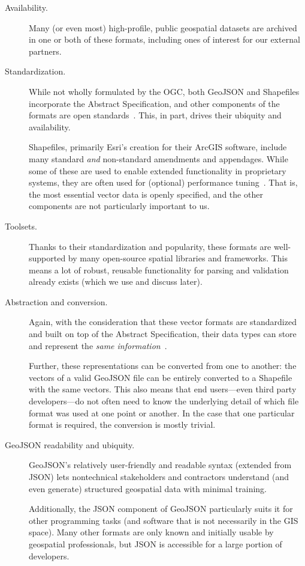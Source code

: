 \begin{description}
  \item[Availability.] Many (or even most) high-profile, public geospatial datasets are archived in one or both of these formats, including ones of interest for our external partners.
  \item[Standardization.] While not wholly formulated by the OGC, both GeoJSON and Shapefiles incorporate the Abstract Specification, and other components of the formats are open standards~\cite{Environ1998,GeoJSON}. This, in part, drives their ubiquity and availability.
  
Shapefiles, primarily Esri's creation for their ArcGIS software, include many standard \textit{and} non-standard amendments and appendages. While some of these are used to enable extended functionality in proprietary systems, they are often used for (optional) performance tuning~\cite{Environ1998}. That is, the most essential vector data is openly specified, and the other components are not particularly important to us.

\item[Toolsets.] Thanks to their standardization and popularity, these formats  are well-supported by many open-source spatial libraries and frameworks. This means a lot of robust, reusable functionality for parsing and validation already exists (which we use and discuss later).

\item[Abstraction and conversion.] Again, with the consideration that these vector formats are standardized and built on top of the Abstract Specification, their data types can store and represent the \textit{same information}~\cite{AbstractSpecFaq}.

Further, these representations can be converted from one to another: the vectors of a valid GeoJSON file can be entirely converted to a Shapefile with the same vectors. This also means that end users---even third party developers---do not often need to know the underlying detail of which file format was used at one point or another. In the case that one particular format is required, the conversion is mostly trivial.

\item[GeoJSON readability and ubiquity.] GeoJSON's relatively user-friendly and readable syntax (extended from JSON) lets nontechnical stakeholders and contractors understand (and even generate) structured geospatial data with minimal training.

Additionally, the JSON component of GeoJSON particularly suits it for other programming tasks (and software that is not necessarily in the GIS space). Many other formats are only known and initially usable by geospatial professionals, but JSON is accessible for a large portion of developers.

\end{description}

